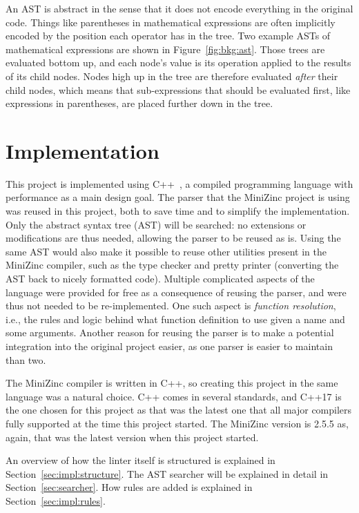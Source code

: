 \documentclass[a4paper,12pt]{article}
\begin{document}
An AST is abstract in the sense that it does not encode everything in the original code.
Things like parentheses in mathematical expressions are often implicitly encoded by the
position each operator has in the tree.
Two example ASTs of mathematical expressions are shown in Figure~\ref{fig:bkg:ast}.
Those trees are evaluated bottom up, and each node's value is
its operation applied to the results of its child nodes. Nodes high up in the tree are
therefore evaluated \emph{after} their child nodes, which means that sub-expressions that
should be evaluated first, like expressions in parentheses, are placed further down in the
tree.

\section{Implementation}\label{sec:impl}
This project is implemented using C++~\cite{cpp}, a compiled programming language with
performance as a main design goal. The parser that the MiniZinc project is
using was reused in this project, both to save time and to simplify the implementation.
Only the abstract syntax tree (AST) will be searched: no extensions or
modifications are thus needed, allowing the parser to be reused as is.
Using the same AST would also make it possible to reuse other utilities
present in the MiniZinc compiler, such as the type checker and pretty printer (converting
the AST back to nicely formatted code). Multiple complicated aspects of the language were
provided for free as a consequence of reusing the parser, and were thus not needed to be
re-implemented. One such aspect is \emph{function
resolution}, i.e., the rules and logic behind what function definition to use given a name
and some arguments. Another reason
for reusing the parser is to make a potential integration into the original project easier,
as one parser is easier to maintain than two.

The MiniZinc
compiler is written in C++, so creating this project in the
same language was a natural choice. C++ comes in several standards, and C++17 is the one
chosen for this project as that was the latest one that all major compilers fully supported at
the time this project started. The MiniZinc version is 2.5.5 as, again, that was the
latest version when this project started.

An overview of how the linter itself is structured is explained in
Section~\ref{sec:impl:structure}. The AST searcher will be explained in detail in
Section~\ref{sec:searcher}. How rules are added is explained in Section~\ref{sec:impl:rules}.
\end{document}

